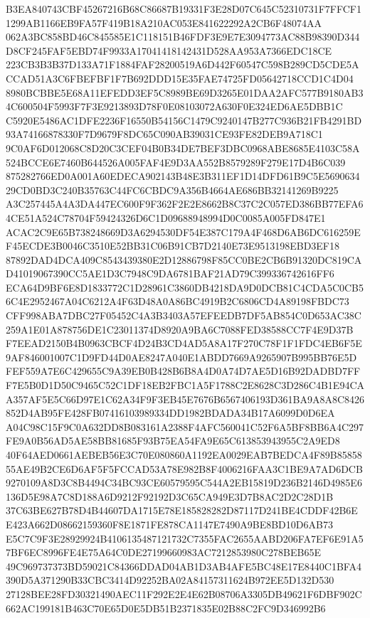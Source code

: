 \documentclass[UTF8,fontset=fandol,zihao=-4,a4paper]{ctexart}
\begin{document}
{{B3EA840743CBF45267216B68C86687B19331F3E28D07C645C52310731F7FFCF11299AB1166EB9FA57F419B18A210AC053E841622292A2CB6F48074AA
062A3BC858BD46C845585E1C118151B46FDF3E9E7E3094773AC88B98390D344D8CF245FAF5EBD74F9933A17041418142431D528AA953A7366EDC18CE
223CB3B3B37D133A71F1884FAF28200519A6D442F60547C598B289CD5CDE5ACCAD51A3C6FBEFBF1F7B692DDD15E35FAE74725FD05642718CCD1C4D04
8980BCBBE5E68A11EFEDD3EF5C8989BE69D3265E01DAA2AFC577B9180AB34C600504F5993F7F3E9213893D78F0E08103072A630F0E324ED6AE5DBB1C
C5920E5486AC1DFE2236F16550B54156C1479C9240147B277C936B21FB4291BD93A74166878330F7D9679F8DC65C090AB39031CE93FE82DEB9A718C1
9C0AF6D012068C8D20C3CEF04B0B34DE7BEF3DBC0968ABE8685E4103C58A524BCCE6E7460B644526A005FAF4E9D3AA552B8579289F279E17D4B6C039
875282766ED0A001A60EDECA902143B48E3B311EF1D14DFD61B9C5E569063429CD0BD3C240B35763C44FC6CBDC9A356B4664AE686BB32141269B9225
A3C257445A4A3DA447EC600F9F362F2E2E8662B8C37C2C057ED386BB77EFA64CE51A524C78704F59424326D6C1D09688948994D0C0085A005FD847E1
ACAC2C9E65B738248669D3A6294530DF54E387C179A4F468D6AB6DC616259EF45ECDE3B0046C3510E52BB31C06B91CB7D2140E73E9513198EBD3EF18
87892DAD4DCA409C8543439380E2D12886798F85CC0BE2CB6B91320DC819CAD41019067390CC5AE1D3C7948C9DA6781BAF21AD79C399336742616FF6
ECA64D9BF6E8D1833772C1D28961C3860DB4218DA9D0DCB81C4CDA5C0CB56C4E2952467A04C6212A4F63D48A0A86BC4919B2C6806CD4A89198FBDC73
CFF998ABA7DBC27F05452C4A3B3403A57EFEEDB7DF5AB854C0D653AC38C259A1E01A878756DE1C23011374D8920A9BA6C7088FED38588CC7F4E9D37B
F7EEAD2150B4B0963CBCF4D24B3CD4AD5A8A17F270C78F1F1FDC4EB6F5E9AF846001007C1D9FD44D0AE8247A040E1ABDD7669A9265907B995BB76E5D
FEF559A7E6C429655C9A39EB0B428B6B8A4D0A74D7AE5D16B92DADBD7FFF7E5B0D1D50C9465C52C1DF18EB2FBC1A5F1788C2E8628C3D286C4B1E94CA
A357AF5E5C66D97E1C62A34F9F3EB45E7676B6567406193D361BA9A8A8C8426852D4AB95FE428FB07416103989334DD1982BDADA34B17A6099D0D6EA
A04C98C15F9C0A632DD8B083161A2388F4AFC560041C52F6A5BF8BB6A4C297FE9A0B56AD5AE58BB81685F93B75EA54FA9E65C613853943955C2A9ED8
40F64AED0661AEBEB56E3C70E080860A1192EA0029EAB7BEDCA4F89B8585855AE49B2CE6D6AF5F5FCCAD53A78E982B8F4006216FAA3C1BE9A7AD6DCB
9270109A8D3C8B4494C34BC93CE60579595C544A2EB15819D236B2146D4985E6136D5E98A7C8D188A6D9212F92192D3C65CA949E3D7B8AC2D2C28D1B
37C63BE627B78D4B44607DA1715E78E185828282D87117D241BE4CDDF42B6EE423A662D08662159360F8E1871FE878CA1147E7490A9BE8BD10D6AB73
E5C7C9F3E28929924B4106135487121732C7355FAC2655AABD206FA7EF6E91A57BF6EC8996FE4E75A64C0DE27199660983AC7212853980C278BEB65E
49C969737373BD59021C84366DDAD04AB1D3AB4AFE5BC48E17E8440C1BFA4390D5A371290B33CBC3414D92252BA02A84157311624B972EE5D132D530
27128BEE28FD30321490AEC11F292E2E4E62B08706A3305DB49621F6DBF902C662AC199181B463C70E65D0E5DB51B2371835E02B88C2FC9D346992B6
}}
\end{document}
